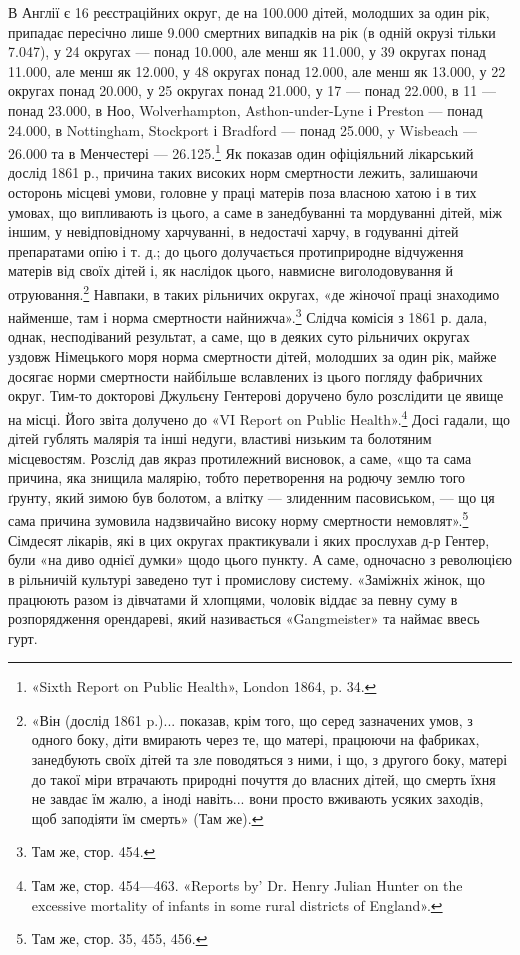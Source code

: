 В Англії є 16 реєстраційних округ, де на 100.000 дітей, молодших
за один рік, припадає пересічно лише 9.000 смертних випадків
на рік (в одній окрузі тільки 7.047), у 24 округах — понад 10.000,
але менш як 11.000, у 39 округах понад 11.000, але менш як 12.000,
у 48 округах понад 12.000, але менш як 13.000, у 22 округах
понад 20.000, у 25 округах понад 21.000, у 17 — понад 22.000,
в 11 — понад 23.000, в Ноо, Wolverhampton, Asthon-under-Lyne
і Preston — понад 24.000, в Nottingham, Stockport і Bradford —
понад 25.000, y Wisbeach — 26.000 та в Менчестері — 26.125.\footnote{
«Sixth Report on Public Health», London 1864, p. 34.
}
Як показав один офіціяльний лікарський дослід 1861 р., причина
таких високих норм смертности лежить, залишаючи осторонь
місцеві умови, головне у праці матерів поза власною хатою і в
тих умовах, що випливають із цього, а саме в занедбуванні та
мордуванні дітей, між іншим, у невідповідному харчуванні, в
недостачі харчу, в годуванні дітей препаратами опію і т. д.;
до цього долучається протиприродне відчуження матерів від
своїх дітей і, як наслідок цього, навмисне виголодовування й
отруювання.\footnote{
«Він (дослід 1861 p.)... показав, крім того, що серед зазначених
умов, з одного боку, діти вмирають через те, що матері, працюючи на фабриках,
занедбують своїх дітей та зле поводяться з ними, і що, з другого
боку, матері до такої міри втрачають природні почуття до власних
дітей, що смерть їхня не завдає їм жалю, а іноді навіть... вони просто вживають
усяких заходів, щоб заподіяти їм смерть» (Там же).
} Навпаки, в таких рільничих округах, «де жіночої
праці знаходимо найменше, там і норма смертности найнижча».\footnote{
Там же, стор. 454.
}
Слідча комісія з 1861 р. дала, однак, несподіваний результат,
а саме, що в деяких суто рільничих округах уздовж Німецького
моря норма смертности дітей, молодших за один рік, майже
досягає норми смертности найбільше вславлених із цього погляду
фабричних округ. Тим-то докторові Джульєну Гентерові доручено
було розслідити це явище на місці. Його звіта долучено до
«VI Report on Public Health».\footnote{
Там же, стор. 454—463. «Reports by' Dr. Henry Julian Hunter
on the excessive mortality of infants in some rural districts of England».
} Досі гадали, що дітей гублять малярія
та інші недуги, властиві низьким та болотяним місцевостям.
Розслід дав якраз протилежний висновок, а саме, «що та сама
причина, яка знищила малярію, тобто перетворення на родючу
землю того ґрунту, який зимою був болотом, а влітку — злиденним
пасовиськом, — що ця сама причина зумовила надзвичайно
високу норму смертности немовлят».\footnote{
Там же, стор. 35, 455, 456.
} Сімдесят лікарів, які
в цих округах практикували і яких прослухав д-р Гентер,
були «на диво однієї думки» щодо цього пункту. А саме, одночасно
з революцією в рільничій культурі заведено тут і промислову
систему. «Заміжніх жінок, що працюють разом із дівчатами й
хлопцями, чоловік віддає за певну суму в розпорядження орендареві,
який називається «Gangmeister» та наймає ввесь гурт.